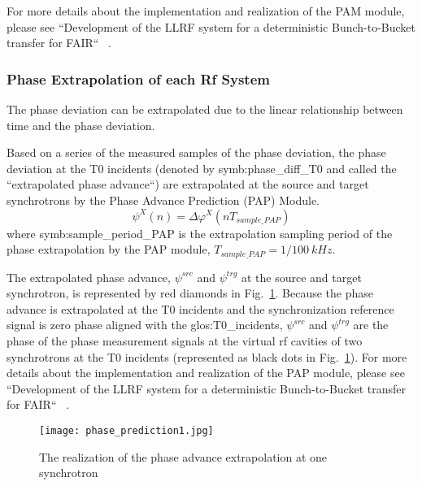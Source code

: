 For more details about the implementation and realization of the PAM module, please see ``Development of the LLRF system for a deterministic Bunch-to-Bucket transfer for FAIR`` ~\cite{ferrand_development_????}. 
\subsubsection{Phase Extrapolation of each Rf System}
The phase deviation can be extrapolated due to the linear relationship between time and the phase deviation. 

Based on a series of the measured samples of the phase deviation, the phase deviation at the T0 incidents (denoted by \gls{symb:phase_diff_T0} and called the ``extrapolated phase advance``) are extrapolated at the source and target synchrotrons by the Phase Advance Prediction (\gls{PAP}) Module.
\begin{equation}
\psi^\mathit{X}(n)=\Delta \varphi^X(nT_\mathit{sample\_PAP})
\end{equation}
where \gls{symb:sample_period_PAP} is the extrapolation sampling period of the phase extrapolation by the PAP module, $T_\mathit{sample\_PAP}=1/\SI{100}{kHz}$.

The extrapolated phase advance, $\psi^\mathit{src}$ and $\psi^\mathit{trg}$ at the source and target synchrotron, is represented by red diamonds in Fig.~\ref{phase_prediction1}. Because the phase advance is extrapolated at the T0 incidents and the synchronization reference signal is zero phase aligned with the \gls{glos:T0_incidents}, $\psi^\mathit{src}$ and $\psi^\mathit{trg}$ are the phase of the phase measurement signals at the virtual rf cavities of two synchrotrons at the T0 incidents (represented as black dots in Fig.~\ref{phase_prediction1}). For more details about the implementation and realization of the PAP module, please see ``Development of the LLRF system for a deterministic Bunch-to-Bucket transfer for FAIR`` ~\cite{ferrand_development_????}.   
\begin{figure}[!htb]
   \centering   
   \texttt{[image: phase\_prediction1.jpg]}
   \caption{The realization of the phase advance extrapolation at one synchrotron}
   \label{phase_prediction1}
\end{figure}
